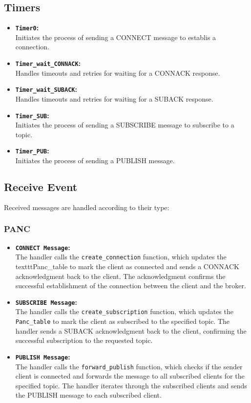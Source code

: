\documentclass[11pt]{article}
\begin{document}
\subsection*{Timers}
\begin{itemize}
\item{\textbf{\texttt{Timer0}:}}\\
Initiates the process of sending a CONNECT message to establis a connection.
\item{\textbf{\texttt{Timer\_wait\_CONNACK}:}}\\
Handles timeouts and retries for waiting for a CONNACK response.
\item{\textbf{\texttt{Timer\_wait\_SUBACK}:}}\\
Handles timeouts and retries for waiting for a SUBACK response.
\item{\textbf{\texttt{Timer\_SUB}:}}\\
Initiates the process of sending a SUBSCRIBE message to subscribe to a topic.
\item{\textbf{\texttt{Timer\_PUB}:}}\\
Initiates the process of sending a PUBLISH message.
\end{itemize}

\subsection*{Receive Event}
Received messages are handled according to their type:
\subsubsection*{PANC}
\begin{itemize}
\item{\textbf{\texttt{CONNECT Message}:}}\\
The handler calls the \texttt{create\_connection} function, which updates the texttt{Panc\_table} to mark the client as connected and sends a CONNACK acknowledgment back to the client.
The acknowledgment confirms the successful establishment of the connection between the client and the broker.
\item{\textbf{\texttt{SUBSCRIBE Message}:}}\\
The handler calls the \texttt{create\_subscription} function, which updates the \texttt{Panc\_table} to mark the client as subscribed to the specified topic.
The handler sends a SUBACK acknowledgment back to the client, confirming the successful subscription to the requested topic.
\item{\textbf{\texttt{PUBLISH Message}:}}\\
The handler calls the \texttt{forward\_publish} function, which checks if the sender client is connected and forwards the message to all subscribed clients for the specified topic.
The handler iterates through the subscribed clients and sends the PUBLISH message to each subscribed client.
\end{itemize}
\end{document}
